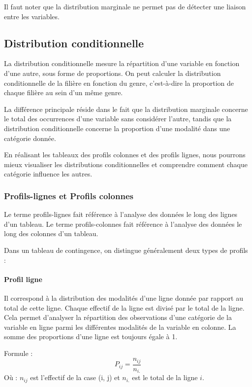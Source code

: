 \documentclass[a4paper,12pt]{article}
\begin{document}
Il faut noter que la distribution marginale ne permet pas de détecter une liaison entre les variables.

\subsection{Distribution conditionnelle}

La distribution conditionnelle mesure la répartition d'une variable en fonction d'une autre, sous forme de proportions. On peut calculer la distribution conditionnelle de la filière en fonction du genre, c'est-à-dire la proportion de chaque filière au sein d’un même genre. 

La différence principale réside dans le fait que la distribution marginale concerne le total des occurrences d’une variable sans considérer l’autre, tandis que la distribution conditionnelle concerne la proportion d’une modalité dans une catégorie donnée. 

En réalisant les tableaux des profils colonnes et des profils lignes, nous pourrons mieux visualiser les distributions conditionnelles et comprendre comment chaque catégorie influence les autres.

\subsubsection{Profils-lignes et Profils colonnes}

Le terme profils-lignes fait référence à l'analyse des données le long des lignes d'un tableau. Le terme profils-colonnes fait référence à l'analyse des données le long des colonnes d'un tableau. 

Dans un tableau de contingence, on distingue généralement deux types de profils :

\paragraph{Profil ligne}
Il correspond à la distribution des modalités d'une ligne donnée par rapport au total de cette ligne. Chaque effectif de la ligne est divisé par le total de la ligne. Cela permet d'analyser la répartition des observations d’une catégorie de la variable en ligne parmi les différentes modalités de la variable en colonne. La somme des proportions d'une ligne est toujours égale à 1.

Formule :
\[
P_{ij} = \frac{n_{ij}}{n_{i.}}
\]
Où : \( n_{ij} \) est l’effectif de la case (i, j) et \( n_{i.} \) est le total de la ligne \( i \).
\end{document}
